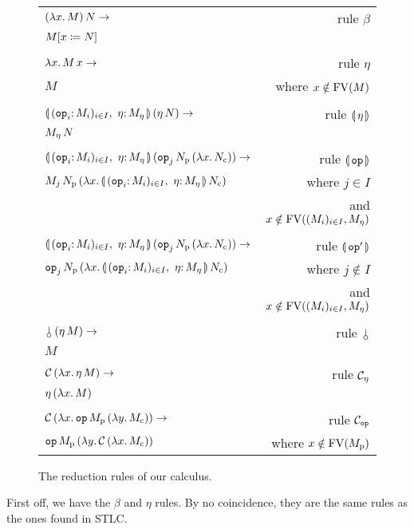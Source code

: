 \begin{figure}
  \centering
  \begin{tabular}{lr}
  $(\lambda x.\, M)\,N \to$ & rule $\beta$ \\
  $M[x \coloneqq N]$ & \\
  \\
  $\lambda x.\, M\,x \to$ & rule $\eta$ \\
  $M$ & where $x \notin \operatorname{FV}(M)$ \\
  \\
  $\ap{\cibanana}{(\ap{\eta}{N})} \to$ & rule $\llparenthesis \, \eta \, \rrparenthesis$ \\
  $M_\eta\,N$ & \\
  \\
  $\ap{\cibanana}{(\ap{\ap{\op{op}_j}{N_{\mathrm{p}}}}{(\lam{x}{N_{\mathrm{c}}})})} \to$ & rule $\llparenthesis \, \mathtt{op} \, \rrparenthesis$ \\
  $\ap{M_j}{\ap{N_{\mathrm{p}}}{(\lam{x}{\ap{\cibanana}{N_{\mathrm{c}}}})}}$
  & where $j \in I$ \\
  & and $x \notin \operatorname{FV}((M_i)_{i \in I}, M_\eta)$ \\
  \\
  $\ap{\cibanana}{(\ap{\ap{\op{op}_j}{N_{\mathrm{p}}}}{(\lam{x}{N_{\mathrm{c}}})})} \to$ & rule $\llparenthesis \, \mathtt{op}' \, \rrparenthesis$ \\
  $\ap{\op{op}_j}{\ap{N_{\mathrm{p}}}{(\lam{x}{\ap{\cibanana}{N_{\mathrm{c}}}})}}$
  & where $j \notin I$ \\
  & and $x \notin \operatorname{FV}((M_i)_{i \in I}, M_\eta)$ \\
  \\
  $\ap{\cherry}{(\ap{\eta}{M})} \to$ & rule $\cherry$ \\
  $M$ & \\
  \\
  $\mathcal{C}\,(\lambda x.\, \eta\,M) \to$ & rule $\mathcal{C}_\eta$ \\
  $\eta\,(\lambda x.\, M)$ & \\
  \\
  $\mathcal{C}\,(\lambda x.\, \mathtt{op}\,M_{\mathrm{p}}\,(\lambda y.\, M_{\mathrm{c}})) \to$ & rule $\mathcal{C}_{\mathtt{op}}$ \\
  $\mathtt{op}\,M_{\mathrm{p}}\,(\lambda y.\, \mathcal{C}\,(\lambda x.\, M_{\mathrm{c}}))$
  & where $x \notin \operatorname{FV}(M_{\mathrm{p}})$
  \end{tabular}
  
  \caption{\label{fig:reductions} The reduction rules of our calculus.}
\end{figure}


First off, we have the $\beta$ and $\eta$ rules. By no coincidence, they
are the same rules as the ones found in STLC.


